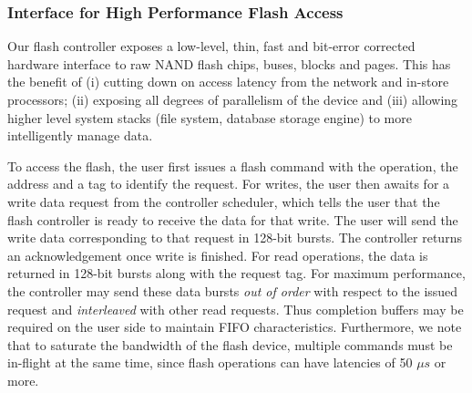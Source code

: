 \subsubsection{Interface for High Performance Flash Access}
 Our flash controller exposes a low-level, thin,
fast and bit-error corrected hardware interface to raw NAND flash chips, buses,
blocks and pages. This has the benefit of (i) cutting down on access latency
from the network and in-store processors; (ii) exposing all degrees of
parallelism of the device and (iii) allowing higher level system stacks (file
system, database storage engine) to more intelligently manage data. 

To access the flash, the user first issues a flash command
with the operation, the address and a tag to identify the request.
For writes, the user then awaits for a write data request from
the controller scheduler, which tells the user that the flash controller is
ready to receive the data for that write. The user will send the write data
corresponding to that request in 128-bit bursts. The controller returns an
acknowledgement once write is finished. 
For read operations, the data is returned in 128-bit bursts along with the request tag.
For maximum performance, the
controller may send these data bursts \emph{out of order} with respect to
the issued request and \emph{interleaved} with other read requests.
Thus completion buffers may be required on the user side to maintain FIFO
characteristics. Furthermore,
we note that to saturate the bandwidth of the flash device, multiple
commands must be in-flight at the same time, since flash operations
can have latencies of 50 $\mu s$ or more. 


